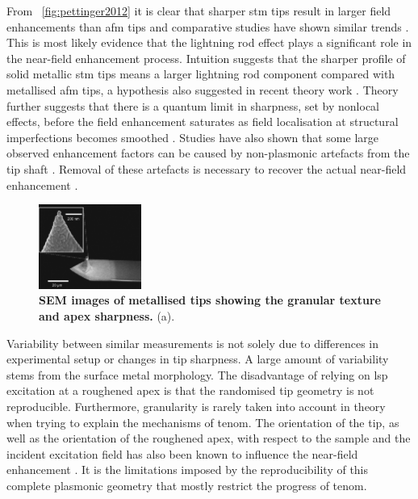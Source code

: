 \documentclass{article}
\begin{document}
From \figurename~\ref{fig:pettinger2012} it is clear that sharper \gls{stm} tips result in larger field enhancements than \gls{afm} tips and comparative studies have shown similar trends \cite{raschke2003, yeo2006, picardi2007}. This is most likely evidence that the lightning rod effect plays a significant role in the near-field enhancement process. Intuition suggests that the sharper profile of solid metallic \gls{stm} tips means a larger lightning rod component compared with metallised \gls{afm} tips, a hypothesis also suggested in recent theory work \cite{zhang2009}. Theory further suggests that there is a quantum limit in sharpness, set by nonlocal effects, before the field enhancement saturates as field localisation at structural imperfections becomes smoothed \cite{wiener2012}. Studies have also shown that some large observed enhancement factors can be caused by non-plasmonic artefacts from the tip shaft \cite{ramos2012}. Removal of these artefacts is necessary to recover the actual near-field enhancement \cite{kumar2014}.

\begin{figure}[bt]
\centering
\includegraphics[width=0.3\textwidth, clip=true, trim=5 75 113 10]{figures/literature/nn-2014-031803_0002}
\caption[]{\textbf{SEM images of metallised tips showing the granular texture and apex sharpness.} (a)\cite{hayazawa2001, hayazawa2012, mino2014}.}
\label{fig:metallised_tips}
\end{figure}

Variability between similar measurements is not solely due to differences in experimental setup or changes in tip sharpness. A large amount of variability stems from the surface metal morphology. The disadvantage of relying on \gls{lsp} excitation at a roughened apex is that the randomised tip geometry is not reproducible. Furthermore, granularity is rarely taken into account in theory when trying to explain the mechanisms of \gls{tenom}. The orientation of the tip, as well as the orientation of the roughened apex, with respect to the sample and the incident excitation field has also been known to influence the near-field enhancement \cite{yeo2006, mino2014}. It is the limitations imposed by the reproducibility of this complete plasmonic geometry that mostly restrict the progress of \gls{tenom}.
\end{document}
